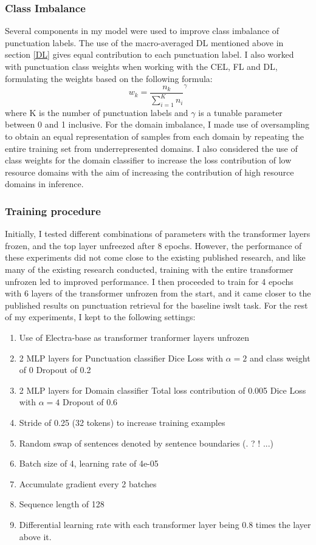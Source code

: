 \documentclass[a4paper]{article}
\begin{document}
\begin{multicols}{2}
\subsubsection{Class Imbalance}
Several components in my model were used to improve class imbalance of punctuation labels. The use of the macro-averaged DL mentioned above in section \ref{DL} gives equal contribution to each punctuation label. I also worked with punctuation class weights when working with the CEL, FL and DL, formulating the weights based on the following formula: \[
w_k=\frac{n_k}{\sum_{i=1}^{K}{n_i}}^{\gamma}
\] where K is the number of punctuation labels and $\gamma$ is a tunable parameter between 0 and 1 inclusive. For the domain imbalance, I made use of oversampling to obtain an equal representation of samples from each domain by repeating the entire training set from underrepresented domains. I also considered the use of class weights for the domain classifier to increase the loss contribution of low resource domains with the aim of increasing the contribution of high resource domains in inference. 
\subsubsection{Training procedure}

Initially, I tested different combinations of parameters with the transformer layers frozen, and the top layer unfreezed after 8 epochs. However, the performance of these experiments did not come close to the existing published research, and like many of the existing research conducted, training with the entire transformer unfrozen led to improved performance.
I then proceeded to train for 4 epochs with 6 layers of the transformer unfrozen from the start, and it came closer to the published results on punctuation retrieval for the baseline iwslt task.
For the rest of my experiments, I kept to the following settings:
\begin{enumerate}
    \item Use of Electra-base as transformer
         tranformer layers unfrozen
    \item 2 MLP layers for Punctuation classifier
        \subitem Dice Loss with $\alpha=2$ and class weight of 0
        \subitem Dropout of 0.2
    \item 2 MLP layers for Domain classifier
        \subitem Total loss contribution of 0.005
        \subitem Dice Loss with $\alpha=4$
        \subitem Dropout of 0.6
    \item Stride of 0.25 (32 tokens) to increase training examples
    \item Random swap of sentences denoted by sentence boundaries (. ? ! ...)
    \item Batch size of 4, learning rate of 4e-05
    \item Accumulate gradient every 2 batches
    \item Sequence length of 128
    \item Differential learning rate with each transformer layer being 0.8 times the layer above it. 
\end{enumerate}


\end{multicols}
\end{document}
